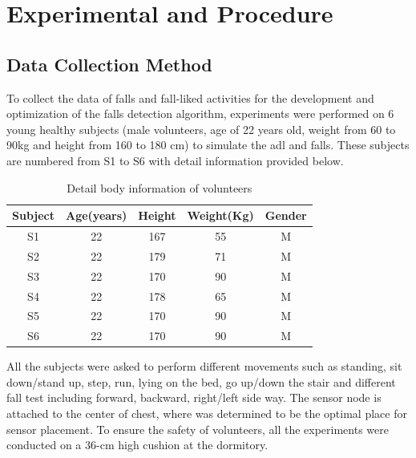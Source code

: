 \documentclass[letterpaper,12pt,titlepage,oneside,final]{book}
\begin{document}
\chapter{Experimental and Procedure}

\section{Data Collection Method}
To collect the data of falls and fall-liked activities for the development and optimization of the falls detection algorithm, experiments were performed on 6 young healthy subjects (male volunteers, age of 22 years old, weight from 60 to 90kg and height from 160 to 180 cm) to simulate the \gls{adl} and falls. These subjects are numbered from S1 to S6 with detail information provided below.
\begin{table}[h]
	\begin{center}
		\begin{tabular}{ |c|c|c|c|c| } 
			\hline
			Subject & Age(years) & Height & Weight(Kg) & Gender \\
			\hline
			S1 & 22 & 167 & 55 & M\\ %
			S2 & 22 & 179 & 71 & M\\ %
			S3 & 22 & 170 & 90 & M\\ %
			S4 & 22 & 178 & 65 & M\\ %
			S5 & 22 & 170 & 90 & M\\ %
			S6 & 22 & 170 & 90 & M\\ %
			\hline
		\end{tabular}
		\caption{Detail body information of volunteers}
		\label{table:1}
	\end{center}
\end{table}\par
All the subjects were asked to perform different movements such as standing, sit down/stand up, step, run, lying on the bed, go up/down the stair and different fall test including forward, backward, right/left side way. The sensor node is attached to the center of chest, where was determined to be the optimal place for sensor placement. To ensure the safety of volunteers, all the experiments were conducted on a 36-cm high cushion at the dormitory.
\end{document}
